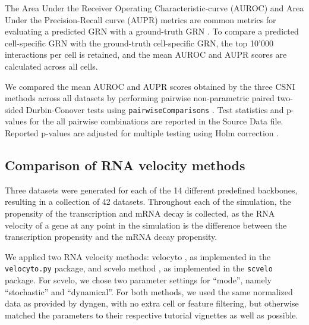 \documentclass[10pt, a4paper]{article}
\begin{document}
The Area Under the Receiver Operating Characteristic-curve (AUROC) and
Area Under the Precision-Recall curve (AUPR) metrics are common metrics
for evaluating a predicted GRN with a ground-truth GRN
\cite{marbach_generatingrealisticsilico_2009}. To compare a
predicted cell-specific GRN with the ground-truth cell-specific GRN, the
top 10'000 interactions per cell is retained, and the mean AUROC and
AUPR scores are calculated across all cells.

We compared the mean AUROC and AUPR scores obtained by the three CSNI
methods across all datasets by performing pairwise non-parametric paired
two-sided Durbin-Conover tests
\cite{conover_multiplecomparisonsprocedures_1979} using
\texttt{pairwiseComparisons}
\cite{patil_pairwisecomparisonsmultiplepairwise_2019}. Test
statistics and p-values for the all pairwise combinations are reported
in the Source Data file. Reported p-values are adjusted for multiple
testing using Holm correction
\cite{holm_simplesequentiallyrejective_1979}.

\subsection{Comparison of RNA velocity methods}\label{sec:dyngen-velcompare}

Three datasets were generated for each of the 14 different predefined
backbones, resulting in a collection of 42 datasets. Throughout each of
the simulation, the propensity of the transcription and mRNA decay is
collected, as the RNA velocity of a gene at any point in the simulation
is the difference between the transcription propensity and the mRNA
decay propensity.

We applied two RNA velocity methods: velocyto
\cite{lamanno_rnavelocitysingle_2018}, as implemented in the
\texttt{velocyto.py} package, and scvelo method
\cite{bergen_generalizingrnavelocity_2020}, as implemented in the
\texttt{scvelo} package. For scvelo, we chose two parameter settings for
``mode'', namely ``stochastic'' and ``dynamical''. For both methods, we
used the same normalized data as provided by dyngen, with no extra cell
or feature filtering, but otherwise matched the parameters to their
respective tutorial vignettes as well as possible.
\end{document}

